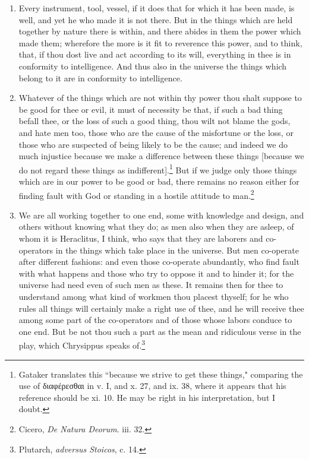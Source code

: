 \begin{enumerate}
\item Every instrument, tool, vessel, if it does that for which it has been made, is well, and yet he who made it is not there. But in the things which are held together by nature there is within, and there abides in them the power which made them; wherefore the more is it fit to reverence this power, and to think, that, if thou dost live and act according to its will, everything in thee is in conformity to intelligence. And thus also in the universe the things which belong to it are in conformity to intelligence.

\item Whatever of the things which are not within thy power thou shalt suppose to be good for thee or evil, it must of necessity be that, if such a bad thing befall thee, or the loss of such a good thing, thou wilt not blame the gods, and hate men too, those who are the cause of the misfortune or the loss, or those who are suspected of being likely to be the cause; and indeed we do much injustice because we make a difference between these things [{\clarify because we do not regard these things as indifferent}].\footnote{Gataker translates this ``because we strive to get these things," comparing the use of \textgreek{διαφέρεσθαι} in v. I, and x. 27, and ix. 38, where it appears that his reference should be xi. 10. He may be right in his interpretation, but I doubt.} But if we judge only those things which are in our power to be good or bad, there remains no reason either for finding fault with God or standing in a hostile attitude to man.\footnote{Cicero, \textit{De Natura Deorum}. iii. 32.}

\item We are all working together to one end, some with knowledge and design, and others without knowing what they do; as men also when they are asleep, of whom it is Heraclitus, I think, who says that they are laborers and co-operators in the things which take place in the universe. But men co-operate after different fashions: and even those co-operate abundantly, who find fault with what happens and those who try to oppose it and to hinder it; for the universe had need even of such men as these. It remains then for thee to understand among what kind of workmen thou placest thyself; for he who rules all things will certainly make a right use of thee, and he will receive thee among some part of the co-operators and of those whose labors conduce to one end. But be not thou such a part as the mean and ridiculous verse in the play, which Chrysippus speaks of.\footnote{Plutarch, \textit{adversus Stoicos}, c. 14.}


\end{enumerate}
